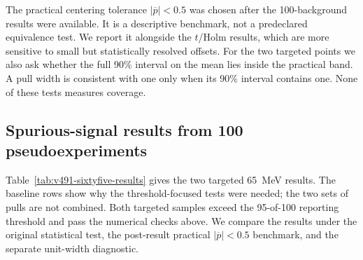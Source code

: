 The practical centering tolerance $|\overline p|<0.5$ was chosen after the
100-background results were available. It is a descriptive benchmark, not a
predeclared equivalence test. We report it alongside the $t$/Holm results, which are
more sensitive to small but statistically resolved offsets. For the two targeted
points we also ask whether the full 90\% interval on the mean lies inside the practical
band. A pull width is consistent with one only when its 90\% interval contains one.
None of these tests measures \CLs{} coverage.

\subsection{Spurious-signal results from 100 pseudoexperiments}
\label{sec:v491-spurious-signal}

Table~\ref{tab:v491-sixtyfive-results} gives the two targeted 65~MeV results. The
baseline rows show why the threshold-focused tests were needed; the two sets of pulls
are not combined. Both targeted samples exceed the 95-of-100 reporting
threshold and pass the numerical checks above.  We compare the results under the
original statistical test, the post-result practical
$|\overline p|<0.5$ benchmark, and the separate unit-width diagnostic.

